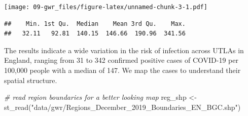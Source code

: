 \documentclass[
]{book}
\newenvironment{Shaded}{\begin{snugshade}}{\end{snugshade}}
\newcommand{\AttributeTok}[1]{\textcolor[rgb]{0.77,0.63,0.00}{#1}}
\newcommand{\CommentTok}[1]{\textcolor[rgb]{0.56,0.35,0.01}{\textit{#1}}}
\newcommand{\DecValTok}[1]{\textcolor[rgb]{0.00,0.00,0.81}{#1}}
\newcommand{\FloatTok}[1]{\textcolor[rgb]{0.00,0.00,0.81}{#1}}
\newcommand{\FunctionTok}[1]{\textcolor[rgb]{0.00,0.00,0.00}{#1}}
\newcommand{\NormalTok}[1]{#1}
\newcommand{\OtherTok}[1]{\textcolor[rgb]{0.56,0.35,0.01}{#1}}
\newcommand{\SpecialCharTok}[1]{\textcolor[rgb]{0.00,0.00,0.00}{#1}}
\newcommand{\StringTok}[1]{\textcolor[rgb]{0.31,0.60,0.02}{#1}}
\begin{document}
\begin{Shaded}
\end{Shaded}

\texttt{[image: 09-gwr\_files/figure-latex/unnamed-chunk-3-1.pdf]}

\begin{Shaded}
\end{Shaded}

\begin{verbatim}
##    Min. 1st Qu.  Median    Mean 3rd Qu.    Max. 
##   32.11   92.81  140.15  146.66  190.96  341.56
\end{verbatim}

The results indicate a wide variation in the risk of infection across UTLAs in England, ranging from 31 to 342 confirmed positive cases of COVID-19 per 100,000 people with a median of 147. We map the cases to understand their spatial structure.

\begin{Shaded}
\begin{Highlighting}[]
\CommentTok{\# read region boundaries for a better looking map}
\NormalTok{reg\_shp }\OtherTok{\textless{}{-}} \FunctionTok{st\_read}\NormalTok{(}\StringTok{"data/gwr/Regions\_December\_2019\_Boundaries\_EN\_BGC.shp"}\NormalTok{)}
\end{Highlighting}
\end{Shaded}
\end{document}
